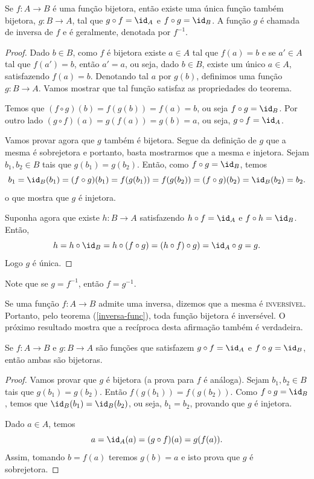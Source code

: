 \begin{theorem}\label{inversa-func}
Se $f:A \rightarrow B$ \'e uma fun\c{c}\~ao bijetora, ent\~ao existe uma
\'unica fun\c{c}\~ao tamb\'em bijetora, $g:B \rightarrow A$, tal que $g
\circ f = \id_A$ e $f \circ g = \id_B$. A fun\c{c}\~ao $g$ \'e chamada de
inversa de $f$ e \'e geralmente, denotada por $f^{-1}$.
\end{theorem}
\begin{proof}
Dado $b \in B$, como $f$ \'e bijetora existe $a \in A$ tal que
$f(a)=b$ e se $a' \in A$ tal que $f(a')=b$, ent\~ao $a'=a$, ou seja,
dado $b \in B$, existe um \'unico $a \in A$, satisfazendo $f(a)=b$.
Denotando tal $a$ por $g(b)$, definimos uma fun\c{c}\~ao $g:B
\rightarrow A$. Vamos mostrar que tal fun\c{c}\~ao satisfaz as
propriedades do teorema.

Temos que $(f \circ g)(b)=f(g(b))=f(a)=b$, ou seja $f \circ
g=\id_B$. Por outro lado $(g \circ f)(a)=g(f(a))=g(b)=a$, ou seja,
$g \circ f=\id_A$.

Vamos provar agora que $g$ tamb\'em \'e bijetora. Segue da defini\c{c}\~ao
de $g$ que a mesma \'e sobrejetora e portanto, basta mostrarmos que
a mesma e injetora. Sejam $b_1,b_2 \in B$ tais que
$g(b_1)=g(b_2)$. Ent\~ao, como $f \circ g=\id_B$, temos
$$
b_1=\id_B(b_1)=(f \circ g)(b_1)=f(g(b_1))=f(g(b_2))=(f \circ
g)(b_2)=\id_B(b_2)=b_2.
$$
o que mostra que $g$ \'e injetora.

Suponha agora que existe $h:B \rightarrow A$ satisfazendo $h \circ
f = \id_A$ e $f \circ h = \id_B$. Ent\~ao,
$$
h=h \circ \id_B= h \circ (f \circ g)= (h \circ f) \circ g)=\id_A
\circ g= g.
$$
Logo $g$ \'e \'unica.
\end{proof}
\begin{remark}
Note que se $g=f^{-1}$, ent\~ao $f=g^{-1}$.
\end{remark}

Se uma fun\c{c}\~ao $f:A \rightarrow B$ admite uma inversa, dizemos que
a mesma \'e \textsc{invers\'ivel}. Portanto, pelo teorema
(\ref{inversa-func}), toda fun\c{c}\~ao bijetora \'e invers\'evel. O pr\'oximo
resultado mostra que a rec\'iproca desta afirma\c{c}\~ao tamb\'em \'e
verdadeira.

\begin{proposition}\label{comp-bije}
Se $f:A \rightarrow B$ e $g:B \rightarrow A$ s\~ao fun\c{c}\~oes que
satisfazem $g \circ f = \id_A$ e $f \circ g = \id_B$, ent\~ao ambas
s\~ao bijetoras.
\end{proposition}
\begin{proof}
Vamos provar que $g$ \'e bijetora (a prova para $f$ \'e an\'aloga).
Sejam $b_1, b_2 \in B$ tais que $g(b_1)=g(b_2)$. Ent\~ao
$f(g(b_1))=f(g(b_2))$. Como $f \circ g = \id_B$, temos que
$\id_B(b_1)=\id_B(b_2)$, ou seja, $b_1=b_2$, provando que $g$ \'e
injetora.

Dado $a \in A$, temos
$$
a=\id_A(a)=(g \circ f)(a)=g(f(a)).
$$
Assim, tomando $b=f(a)$ teremos $g(b)=a$ e isto prova que $g$ \'e
sobrejetora.
\end{proof}